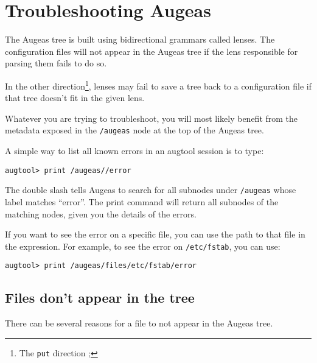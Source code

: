 \chapter{Troubleshooting Augeas}

\label{chap:troubleshooting} 

The Augeas tree is built using bidirectional grammars called lenses. The configuration files will not appear in the Augeas tree if the lens responsible for parsing them fails to do so.

In the other direction\footnote{The \verb!put! direction ; }, lenses may fail to save a tree back to a configuration file if that tree doesn't fit in the given lens.

Whatever you are trying to troubleshoot, you will most likely benefit from the metadata exposed in the \nolinkurl{/augeas} node at the top of the Augeas tree.

A simple way to list all known errors in an augtool session is to type:

 

\begin{verbatim}
augtool> print /augeas//error
\end{verbatim}

The double slash tells Augeas to search for all subnodes under \nolinkurl{/augeas} whose label matches ``error''. The print command will return all subnodes of the matching nodes, given you the details of the errors.

If you want to see the error on a specific file, you can use the path to that file in the expression. For example, to see the error on \nolinkurl{/etc/fstab}, you can use:

 

\begin{verbatim}
augtool> print /augeas/files/etc/fstab/error
\end{verbatim}

\section{Files don't appear in the tree}

There can be several reasons for a file to not appear in the Augeas tree.

